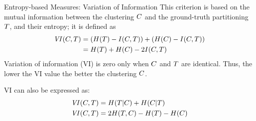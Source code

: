 \begin{frame}{Entropy-based Measures: Variation of Information}
This criterion is based on the mutual information
between the clustering ${\relax C}$ and the ground-truth partitioning
${\relax T}$, and their entropy; it is def\/{i}ned as
\begin{align*}
  \mathit{VI}({\relax C},{\relax T}) &= (H({\relax T})-I({\relax C},{\relax T})) + (H({\relax C})-I({\relax C},{\relax T}))\nonumber\\
    & = H({\relax T})+H({\relax C})-2I({\relax C},{\relax T})
\end{align*}
Variation of information (VI) is zero only when ${\relax C}$ and ${\relax T}$ are identical. Thus, the
lower the VI value the better the clustering ${\relax C}$.

\bigskip
VI can also be expressed as:
\begin{align*}
  \mathit{VI}({\relax C},{\relax T}) & = H({\relax T}|{\relax C}) + H({\relax C}|{\relax T})\\
  \mathit{VI}({\relax C},{\relax T}) & = 2H({\relax T},{\relax C})-H({\relax T})-H({\relax C})
\end{align*}
\end{frame}



